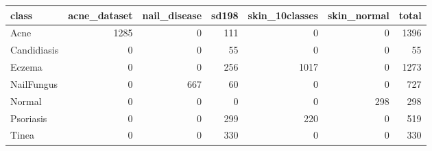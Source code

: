\begin{tabular}{lrrrrrr}
\toprule
class & acne\_dataset & nail\_disease & sd198 & skin\_10classes & skin\_normal & total \\
\midrule
Acne & 1285 & 0 & 111 & 0 & 0 & 1396 \\
Candidiasis & 0 & 0 & 55 & 0 & 0 & 55 \\
Eczema & 0 & 0 & 256 & 1017 & 0 & 1273 \\
NailFungus & 0 & 667 & 60 & 0 & 0 & 727 \\
Normal & 0 & 0 & 0 & 0 & 298 & 298 \\
Psoriasis & 0 & 0 & 299 & 220 & 0 & 519 \\
Tinea & 0 & 0 & 330 & 0 & 0 & 330 \\
\bottomrule
\end{tabular}
